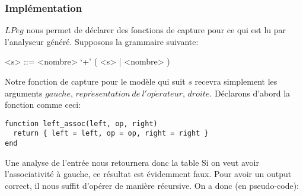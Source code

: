 \documentclass{article}
\begin{document}
\subsubsection{Implémentation}
$LPeg$ nous permet de déclarer des fonctions de capture pour ce qui est lu par l'analyseur généré. Supposons la grammaire suivante:
\begin{grammar}
	<s> ::= <nombre> `+' ( <s> | <nombre> )
\end{grammar}
Notre fonction de capture pour le modèle qui suit $s$ recevra simplement les arguments $gauche$, $repr\acute{e}sentation \ de \ l'op\acute{e}rateur$, $droite$. Déclarons d'abord la fonction comme ceci:
\begin{verbatim}
function left_assoc(left, op, right)
  return { left = left, op = op, right = right }
end
\end{verbatim}
Une analyse de l'entrée  \noindent nous retournera donc la table 
\noindent Si on veut avoir l'associativité à gauche, ce résultat est évidemment faux. Pour avoir un output correct, il nous suffit d'opérer de manière récursive. On a donc (en pseudo-code):
\end{document}
